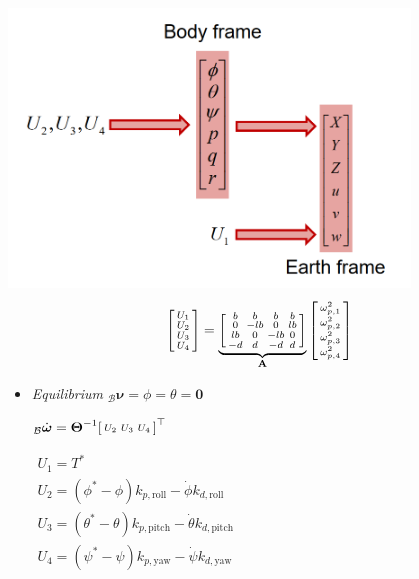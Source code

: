 \documentclass[landscape,a0paper,fontscale=0.285]{baposter} %
\newcommand{\compresslist}{ %
\setlength{\itemsep}{1pt}
\setlength{\parskip}{0pt}
\setlength{\parsep}{0pt}
}
\renewenvironment{bmatrix}{\left[\begin{smallmatrix}}{\end{smallmatrix}\right]}
\begin{document}
\begin{poster}
{\includegraphics[width=0.8\textwidth,trim={0cm 0cm 0cm 0cm},clip]{images/rotorcraft_hierarchicachy_control.png}
\vspace{-10pt}
\[
\begin{bmatrix}U_1\\U_2\\U_3\\U_4\end{bmatrix} = 
\underbrace{\begin{bmatrix}b & b & b & b\\
0 & -lb & 0 & lb\\
lb & 0 & -lb & 0\\
-d & d & -d & d\end{bmatrix}}_{\mathbf{A}}
\begin{bmatrix}\omega_{p,1}^2\\\omega_{p,2}^2\\\omega_{p,3}^2\\\omega_{p,4}^2\end{bmatrix}
\]
\vspace{-20pt}
\begin{itemize}\compresslist
    \item \textit{Equilibrium}
$_{\mathcal{B}}\boldsymbol{\nu} = \phi = \theta = \mathbf{0}$
  
       $_{\mathcal{B}} \dot{\boldsymbol{\omega}} = \boldsymbol{\Theta}^{-1}\begin{bmatrix}U_2 & U_3 & U_4\end{bmatrix}^\top$
       
      $
      \begin{array}{l}
          U_1 = T^* \\
          U_2 = (\phi^* - \phi)k_{p,\text{roll}} - \dot{\phi} k_{d,\text{roll}} \\
          U_3 = (\theta^* - \theta)k_{p,\text{pitch}} - \dot{\theta} k_{d,\text{pitch}} \\
          U_4 = (\psi^* - \psi)k_{p,\text{yaw}} - \dot{\psi} k_{d,\text{yaw}}
      \end{array}
      $



\end{itemize}}
\end{poster}
\end{document}
